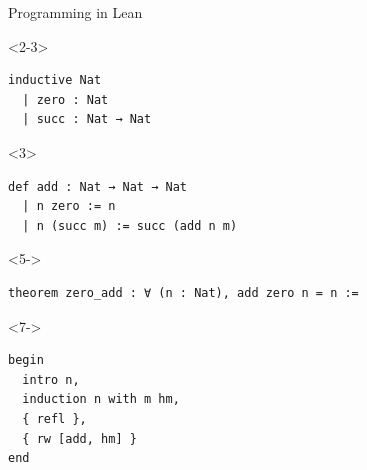 \documentclass[10pt]{beamer}
\begin{document}
\begin{frame}[fragile, t]{Programming in Lean}



\begin{onlyenv}<2-3>
\begin{lstlisting}[basicstyle=\scriptsize, frame=single]
inductive Nat
  | zero : Nat
  | succ : Nat → Nat
\end{lstlisting}
\end{onlyenv}


\begin{onlyenv}<3>
\begin{lstlisting}[basicstyle=\scriptsize, frame=single]
def add : Nat → Nat → Nat
  | n zero := n
  | n (succ m) := succ (add n m)
\end{lstlisting}
\end{onlyenv}



\begin{onlyenv}<5->
\begin{lstlisting}[basicstyle=\scriptsize, frame=single]
theorem zero_add : ∀ (n : Nat), add zero n = n :=
\end{lstlisting}
\end{onlyenv}


\begin{onlyenv}<7->
\begin{lstlisting}[basicstyle=\scriptsize, frame=single]
begin
  intro n,
  induction n with m hm,
  { refl },
  { rw [add, hm] }
end
\end{lstlisting}
\end{onlyenv}



\end{frame}
\end{document}
